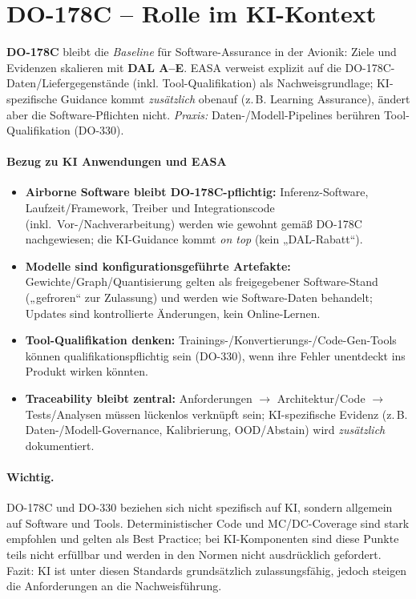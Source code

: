 \section{DO-178C – Rolle im KI-Kontext}
\textbf{DO-178C} bleibt die \emph{Baseline} für Software-Assurance in der Avionik: Ziele und Evidenzen skalieren mit 
\textbf{DAL A–E}. EASA verweist explizit auf die DO-178C-Daten/Liefergegenstände (inkl. Tool-Qualifikation) als Nachweisgrundlage; 
KI-spezifische Guidance kommt \emph{zusätzlich} obenauf (z.\,B. Learning Assurance), ändert aber die Software-Pflichten nicht. 
\emph{Praxis:} Daten-/Modell-Pipelines berühren Tool-Qualifikation (DO-330).

\paragraph{Bezug zu KI Anwendungen und EASA}
\begin{itemize}
  \item \textbf{Airborne Software bleibt DO-178C-pflichtig:} Inferenz-Software, Laufzeit/Framework, Treiber und Integrationscode (inkl.\ Vor-/Nachverarbeitung) werden wie gewohnt gemäß DO-178C nachgewiesen; die KI-Guidance kommt \emph{on top} (kein „DAL-Rabatt“).
  \item \textbf{Modelle sind konfigurationsgeführte Artefakte:} Gewichte/Graph/Quantisierung gelten als freigegebener Software-Stand („gefroren“ zur Zulassung) und werden wie Software-Daten behandelt; Updates sind kontrollierte Änderungen, kein Online-Lernen.
  \item \textbf{Tool-Qualifikation denken:} Trainings-/Konvertierungs-/Code-Gen-Tools können qualifikationspflichtig sein (DO-330), wenn ihre Fehler unentdeckt ins Produkt wirken könnten.
  \item \textbf{Traceability bleibt zentral:} Anforderungen \(\rightarrow\) Architektur/Code \(\rightarrow\) Tests/Analysen müssen lückenlos verknüpft sein; KI-spezifische Evidenz (z.\,B. Daten-/Modell-Governance, Kalibrierung, OOD/Abstain) wird \emph{zusätzlich} dokumentiert.
\end{itemize}
\paragraph{Wichtig.}
DO-178C und DO-330 beziehen sich nicht spezifisch auf KI, sondern allgemein auf Software und Tools. Deterministischer Code 
und MC/DC-Coverage sind stark empfohlen und gelten als Best Practice; bei KI-Komponenten sind diese Punkte teils nicht erfüllbar 
und werden in den Normen nicht ausdrücklich gefordert. Fazit: KI ist unter diesen Standards grundsätzlich zulassungsfähig, jedoch 
steigen die Anforderungen an die Nachweisführung.




